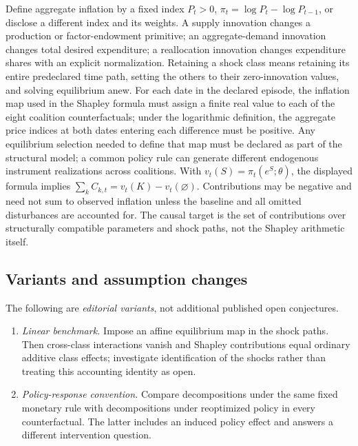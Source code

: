 \documentclass[11pt,a4paper]{article}
\begin{document}
Define aggregate inflation by a fixed index \(P_t>0\), \(\pi_t=\log P_t-\log P_{t-1}\), or disclose a different index and its weights. A supply innovation changes a production or factor-endowment primitive; an aggregate-demand innovation changes total desired expenditure; a reallocation innovation changes expenditure shares with an explicit normalization. Retaining a shock class means retaining its entire predeclared time path, setting the others to their zero-innovation values, and solving equilibrium anew. For each date in the declared episode, the inflation map used in the Shapley formula must assign a finite real value to each of the eight coalition counterfactuals; under the logarithmic definition, the aggregate price indices at both dates entering each difference must be positive. Any equilibrium selection needed to define that map must be declared as part of the structural model; a common policy rule can generate different endogenous instrument realizations across coalitions. With \(v_t(S)=\pi_t(e^S;\theta)\), the displayed formula implies \(\sum_kC_{k,t}=v_t(K)-v_t(\varnothing)\). Contributions may be negative and need not sum to observed inflation unless the baseline and all omitted disturbances are accounted for. The causal target is the set of contributions over structurally compatible parameters and shock paths, not the Shapley arithmetic itself.
\subsection*{Variants and assumption changes}
The following are \emph{editorial variants}, not additional published open conjectures.
\begin{enumerate}
\item \emph{Linear benchmark.} Impose an affine equilibrium map in the shock paths. Then cross-class interactions vanish and Shapley contributions equal ordinary additive class effects; investigate identification of the shocks rather than treating this accounting identity as open.
\item \emph{Policy-response convention.} Compare decompositions under the same fixed monetary rule with decompositions under reoptimized policy in every counterfactual. The latter includes an induced policy effect and answers a different intervention question.
\end{enumerate}
\end{document}

